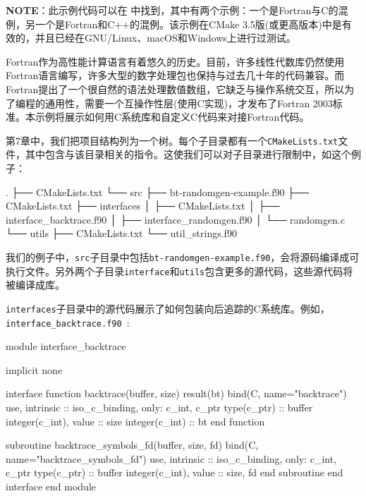 \begin{myInfoBox}
\textbf{NOTE}：此示例代码可以在  中找到，其中有两个示例：一个是Fortran与C的混例，另一个是Fortran和C++的混例。该示例在CMake 3.5版(或更高版本)中是有效的，并且已经在GNU/Linux、macOS和Windows上进行过测试。
\end{myInfoBox}

Fortran作为高性能计算语言有着悠久的历史。目前，许多线性代数库仍然使用Fortran语言编写，许多大型的数字处理包也保持与过去几十年的代码兼容。而Fortran提出了一个很自然的语法处理数值数组，它缺乏与操作系统交互，所以为了编程的通用性，需要一个互操作性层(使用C实现)，才发布了Fortran 2003标准。本示例将展示如何用C系统库和自定义C代码来对接Fortran代码。


第7章中，我们把项目结构列为一个树。每个子目录都有一个\texttt{CMakeLists.txt}文件，其中包含与该目录相关的指令。这使我们可以对子目录进行限制中，如这个例子：

\begin{codebox}[shell]
.
├── CMakeLists.txt
└── src
      ├── bt-randomgen-example.f90
      ├── CMakeLists.txt
      ├── interfaces
      │         ├── CMakeLists.txt
      │         ├── interface_backtrace.f90
      │         ├── interface_randomgen.f90
      │         └── randomgen.c
      └── utils
      ├── CMakeLists.txt
      └── util_strings.f90
\end{codebox}

我们的例子中，\texttt{src}子目录中包括\texttt{bt-randomgen-example.f90}，会将源码编译成可执行文件。另外两个子目录\texttt{interface}和\texttt{utils}包含更多的源代码，这些源代码将被编译成库。

\texttt{interfaces}子目录中的源代码展示了如何包装向后追踪的C系统库。例如，\texttt{interface\_backtrace.f90 }:

\begin{codebox}[fortran]
module interface_backtrace

  implicit none
  
  interface
    function backtrace(buffer, size) result(bt) bind(C, name="backtrace")
      use, intrinsic :: iso_c_binding, only: c_int, c_ptr
      type(c_ptr) :: buffer
      integer(c_int), value :: size
      integer(c_int) :: bt
    end function
    
    subroutine backtrace_symbols_fd(buffer, size, fd) bind(C, name="backtrace_symbols_fd")
      use, intrinsic :: iso_c_binding, only: c_int, c_ptr
      type(c_ptr) :: buffer
      integer(c_int), value :: size, fd
    end subroutine
  end interface
end module
\end{codebox}

